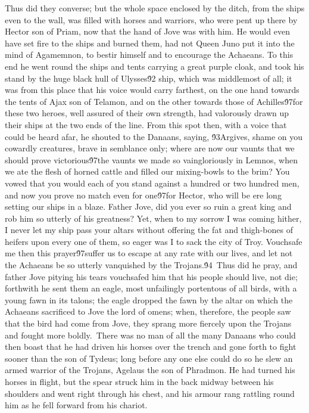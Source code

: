 {Thus did they converse; but the whole space enclosed by the ditch, from the ships even to the wall, was filled with horses and warriors, who were pent up there by Hector son of Priam, now that the hand of Jove was with him. He would even have set fire to the ships and burned them, had not Queen Juno put it into the mind of Agamemnon, to bestir himself and to encourage the Achaeans. To this end he went round the ships and tents carrying a great purple cloak, and took his stand by the huge black hull of Ulysses\'92 ship, which was middlemost of all; it was from this place that his voice would carry farthest, on the one hand towards the tents of Ajax son of Telamon, and on the other towards those of Achilles\'97for these two heroes, well assured of their own strength, had valorously drawn up their ships at the two ends of the line. From this spot then, with a voice that could be heard afar, he shouted to the Danaans, saying, \'93Argives, shame on you cowardly creatures, brave in semblance only; where are now our vaunts that we should prove victorious\'97the vaunts we made so vaingloriously in Lemnos, when we ate the flesh of horned cattle and filled our mixing-bowls to the brim? You vowed that you would each of you stand against a hundred or two hundred men, and now you prove no match even for one\'97for Hector, who will be ere long setting our ships in a blaze. Father Jove, did you ever so ruin a great king and rob him so utterly of his greatness? Yet, when to my sorrow I was coming hither, I never let my ship pass your altars without offering the fat and thigh-bones of heifers upon every one of them, so eager was I to sack the city of Troy. Vouchsafe me then this prayer\'97suffer us to escape at any rate with our lives, and let not the Achaeans be so utterly vanquished by the Trojans.\'94\
Thus did he pray, and father Jove pitying his tears vouchsafed him that his people should live, not die; forthwith he sent them an eagle, most unfailingly portentous of all birds, with a young fawn in its talons; the eagle dropped the fawn by the altar on which the Achaeans sacrificed to Jove the lord of omens; when, therefore, the people saw that the bird had come from Jove, they sprang more fiercely upon the Trojans and fought more boldly.\
There was no man of all the many Danaans who could then boast that he had driven his horses over the trench and gone forth to fight sooner than the son of Tydeus; long before any one else could do so he slew an armed warrior of the Trojans, Agelaus the son of Phradmon. He had turned his horses in flight, but the spear struck him in the back midway between his shoulders and went right through his chest, and his armour rang rattling round him as he fell forward from his chariot.\
}

